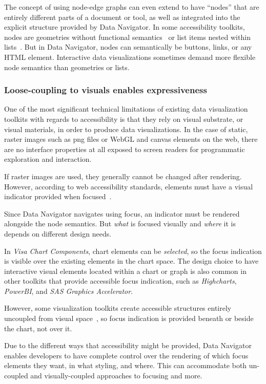 \documentclass[12pt]{cmuthesis}
\begin{document}
The concept of using node-edge graphs can even extend to have ``nodes'' that are entirely different parts of a document or tool, as well as integrated into the explicit structure provided by Data Navigator. In some accessibility toolkits, nodes are geometries without functional semantics~\cite{Satyanarayan2017VegaLite} or list items nested within lists~\cite{Blanco2022olli}. But in Data Navigator, nodes can semantically be buttons, links, or any HTML element. Interactive data visualizations sometimes demand more flexible node semantics than geometries or lists.

\subsubsection{Loose-coupling to visuals enables expressiveness}

One of the most significant technical limitations of existing data visualization toolkits with regards to accessibility is that they rely on visual substrate, or visual materials, in order to produce data visualizations. In the case of static, raster images such as png files or WebGL and canvas elements on the web, there are no interface properties at all exposed to screen readers for programmatic exploration and interaction.

If raster images are used, they generally cannot be changed after rendering. However, according to web accessibility standards, elements must have a visual indicator provided when focused~\cite{WAI2016Focus}.

Since Data Navigator navigates using focus, an indicator must be rendered alongside the node semantics. But \textit{what} is focused visually and \textit{where} it is depends on different design needs.

In \textit{Visa Chart Components}, chart elements can be \textit{selected}, so the focus indication is visible over the existing elements in the chart space. The design choice to have interactive visual elements located within a chart or graph is also common in other toolkits that provide accessible focus indication, such as \textit{Highcharts}, \textit{PowerBI}, and \textit{SAS Graphics Accelerator}.

However, some visualization toolkits create accessible structures entirely uncoupled from visual space~\cite{Blanco2022olli}, so focus indication is provided beneath or beside the chart, not over it.

Due to the different ways that accessibility might be provided, Data Navigator enables developers to have complete control over the rendering of which focus elements they want, in what styling, and where. This can accommodate both un-coupled and visually-coupled approaches to focusing and more.
\end{document}
